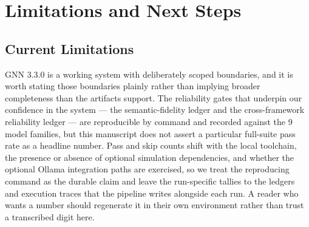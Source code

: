 \documentclass[
  english,
  9pt,
]{extarticle}
\begin{document}
\newpage

\section{Limitations and Next Steps}\label{sec:limitations_next_steps}

\subsection{Current Limitations}\label{current-limitations}

GNN 3.3.0 is a working system with deliberately scoped boundaries, and
it is worth stating those boundaries plainly rather than implying
broader completeness than the artifacts support. The reliability gates
that underpin our confidence in the system --- the semantic-fidelity
ledger and the cross-framework reliability ledger --- are reproducible
by command and recorded against the 9 model families, but this
manuscript does not assert a particular full-suite pass rate as a
headline number. Pass and skip counts shift with the local toolchain,
the presence or absence of optional simulation dependencies, and whether
the optional Ollama integration paths are exercised, so we treat the
reproducing command as the durable claim and leave the run-specific
tallies to the ledgers and execution traces that the pipeline writes
alongside each run. A reader who wants a number should regenerate it in
their own environment rather than trust a transcribed digit here.
\end{document}

